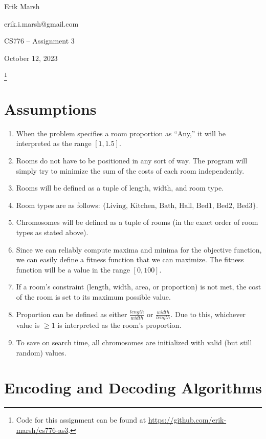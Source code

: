 \documentclass[12pt, letterpaper]{article}
\newcommand\blfootnote[1]{%
  \begingroup
  \renewcommand\thefootnote{}\footnote{#1}%
  \addtocounter{footnote}{-1}%
  \endgroup
}
\begin{document}
\noindent
Erik Marsh

\noindent
erik.i.marsh@gmail.com

\noindent
CS776 -- Assignment 3

\noindent
October 12, 2023


\blfootnote{Code for this assignment can be found at \href{https://github.com/erik-marsh/cs776-as3}{https://github.com/erik-marsh/cs776-as3}.}

\section{Assumptions}

\begin{enumerate}
    \item When the problem specifies a room proportion as ``Any,''
          it will be interpreted as the range $[1, 1.5]$.
    \item Rooms do not have to be positioned in any sort of way.
          The program will simply try to minimize the sum of the costs of each room independently.
    \item Rooms will be defined as a tuple of length, width, and room type.
    \item Room types are as follows: $\{\text{Living, Kitchen, Bath, Hall, Bed1, Bed2, Bed3}\}$.
    \item Chromosomes will be defined as a tuple of rooms (in the exact order of room types as stated above).
    \item Since we can reliably compute maxima and minima for the objective function,
          we can easily define a fitness function that we can maximize.
          The fitness function will be a value in the range $[0, 100]$.
    \item If a room's constraint (length, width, area, or proportion) is not met,
          the cost of the room is set to its maximum possible value.
    \item Proportion can be defined as either $\frac{length}{width}$ or $\frac{width}{length}$.
          Due to this, whichever value is $\geq 1$ is interpreted as the room's proportion.
    \item To save on search time, all chromosomes are initialized with valid (but still random) values.
\end{enumerate}

\vspace{2in}
\pagebreak
\section{Encoding and Decoding Algorithms}
\end{document}
